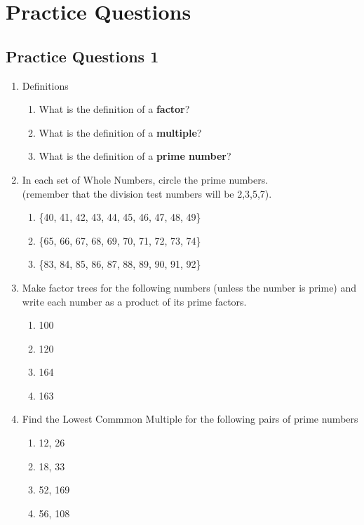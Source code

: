 \documentclass[a4paper,12pt]{article}
\begin{document}
\section{Practice Questions}
\subsection{Practice Questions 1}
\newcommand{\wdth}{2}
\newcommand{\hght}{1}
\begin{enumerate}
	\item Definitions
	\begin{enumerate}
		\item What is the definition of a \textbf{factor}?
		\item What is the definition of a \textbf{multiple}?
		\item What is the definition of a \textbf{prime number}?
	\end{enumerate}
	\item In each set of Whole Numbers, circle the prime numbers.\\
	(remember that the division test numbers will be 2,3,5,7).
	\begin{enumerate}
		\item \{40, 41, 42, 43, 44, 45, 46, 47, 48, 49\}
		\item \{65, 66, 67, 68, 69, 70, 71, 72, 73, 74\}
		\item \{83, 84, 85, 86, 87, 88, 89, 90, 91, 92\}
	\end{enumerate} 
	\item Make factor trees for the following numbers (unless the number is prime) and write each number as a product of its prime factors.
	\begin{multicols}{4}
		\begin{enumerate}
			\item 100
			\item 120
			\item 164
			\item 163
		\end{enumerate}
	\end{multicols}
	\item Find the Lowest Commmon Multiple for the following pairs of prime numbers
	\begin{multicols}{5}
		\begin{enumerate}
			\item 12, 26
			\item 18, 33
			\item 52, 169
			\item 56, 108

\end{enumerate}
\end{multicols}
\end{enumerate}
\end{document}
